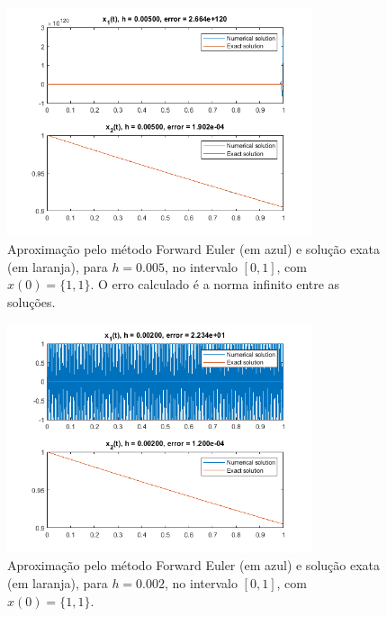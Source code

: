 \documentclass{article}
\begin{document}
\begin{enumerate}
\begin{enumerate}
                    \begin{figure}[!h]
                        \centering
                        \includegraphics[width=0.8\textwidth]{../images/forward_1.png}
                        \caption{Aproximação pelo método Forward Euler (em azul) e
                        solução exata (em laranja), para $h = 0.005$,
                        no intervalo $[0, 1]$, com $x(0) = \{1, 1\}$.
                        O erro calculado é a norma infinito entre as
                        soluções.}
                        \label{fig:forward_1}
                    \end{figure}
                    
                    \begin{figure}[!h]
                        \centering
                        \includegraphics[width=0.8\textwidth]{../images/forward_2.png}
                        \caption{Aproximação pelo método Forward Euler (em azul) e
                        solução exata (em laranja), para $h = 0.002$,
                        no intervalo $[0, 1]$, com $x(0) = \{1, 1\}$.}
                        \label{fig:forward_2}
                    \end{figure}
                    

\end{enumerate}
\end{enumerate}
\end{document}
